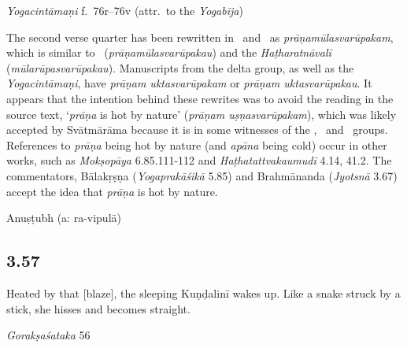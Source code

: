 \begin{ekdosis}
\begin{testimonia}[hp03_056]
\emph{Yogacintāmaṇi} f.~76r–76v (attr.~to the \emph{Yogabīja})
\begin{versinnote}
\end{versinnote}

\end{testimonia}

\begin{philcomm}[hp03_056]
The second verse quarter has been rewritten in \alphaOne\ and \alphaTwo\ as \emph{prāṇamūlasvarūpakam}, 
which is similar to \etaOne\ (\emph{prāṇamūlasvarūpakau}) and the \emph{Haṭharatnāvalī} (\emph{mūlarūpasvarūpakau}). Manuscripts from the delta group, as well as the \emph{Yogacintāmaṇi}, have \emph{prāṇam uktasvarūpakam} or \emph{prāṇam uktasvarūpakau}. It appears that the intention behind these rewrites was to avoid the reading in the source text, `\textit{prāṇa} is hot by nature' (\emph{prāṇam uṣṇasvarūpakam}), which was likely accepted by Svātmārāma because it is in some witnesses of the \textbeta, \textgamma\ and \textzeta\ groups. References to \emph{prāṇa} being hot by nature (and \emph{apāna} being cold) occur in other works, such as \emph{Mokṣopāya} 6.85.111-112 and \emph{Haṭhatattvakaumudī} 4.14, 41.2. The commentators, Bālakṛṣṇa (\emph{Yogaprakāśikā} 5.85) and Brahmānanda (\emph{Jyotsnā} 3.67) accept the idea that \emph{prāṇa} is hot by nature.
%

\end{philcomm}

\begin{metre}[hp03_056]
Anuṣṭubh (a: ra-vipulā)
\end{metre}

\subsection*{3.57}
\begin{translation}[hp03_057]
Heated by that [blaze], the sleeping Kuṇḍalinī wakes up. Like a snake struck by a stick, she hisses and becomes straight.
\end{translation}

\begin{sources}[hp03_057]
\emph{Gorakṣaśataka} 56
\begin{versinnote}
\end{versinnote}
\end{sources}


\end{ekdosis}
